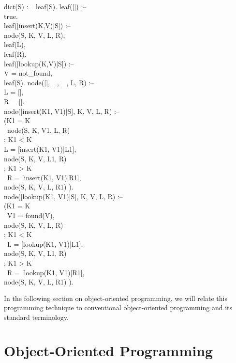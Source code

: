 %
\begin{program}
dict(S) := leaf(S).\nl
leaf([]) :-- \\
\>\cond\>	true.  \\
leaf([insert(K,V)|S]) :-- \\
\>\cond\>	node(S, K, V, L, R), \\
\>\>	leaf(L), \\
\>\>	leaf(R).  \\
leaf([lookup(K,V)|S]) :-- \\
\>\cond\>	V = not_found, \\
\>\>	leaf(S).  \nl
node([], _, _, L, R) :-- \\
\>\cond\>	L = [], \\
\>\>	R = [].  \\
node([insert(K1, V1)|S], K, V, L, R) :-- \\
\>\cond\>	(\>\>K1 = K  \\
\>\>		\>\cond\ \>node(S, K, V1, L, R) \\
\>\>	;	\>\>K1 < K \\
\>\>		\>\cond\>L = [insert(K1, V1)|L1], \\
\>\>		\>\>node(S, K, V, L1, R) \\
\>\>	;	\>\>K1 > K \\
\>\>		\>\cond\ \>R = [insert(K1, V1)|R1], \\
\>\>		\>\>node(S, K, V, L, R1) ).  \\
node([lookup(K1, V1)|S], K, V, L, R) :-- \\
\>\cond\>	(\>\>K1 = K \\
\>\>		\>\cond\ \>V1 = found(V), \\
\>\>		\>\>node(S, K, V, L, R) \\
\>\>	;	\>\>K1 < K \\
\>\>		\>\cond\ \>L = [lookup(K1, V1)|L1], \\
\>\>		\>\>node(S, K, V, L1, R) \\
\>\>	;	\>\>K1 > K \\
\>\>		\>\cond\ \>R = [lookup(K1, V1)|R1], \\
\>\>		\>\>node(S, K, V, L, R1) ).
\end{program}%
%
In the following section on object-oriented programming, we will
relate this programming technique to conventional object-oriented
programming and its standard terminology.

\section{Object-Oriented Programming}

